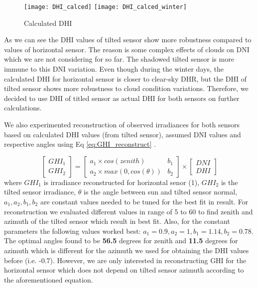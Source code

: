 \begin{figure}[h]
\caption{Calculated DHI}
\label{fig:calc_DHI_day}
\texttt{[image: DHI\_calced]}
\texttt{[image: DHI\_calced\_winter]}
\centering
\end{figure}

As we can see the DHI values of tilted sensor show more robustness compared to values of horizontal sensor. The reason is some complex effects of clouds on DNI which we are not considering for so far. The shadowed tilted sensor is more immune to this DNI variation.  Even though during the winter days, the calculated DHI for horizontal sensor is closer to clear-sky DHR, but the DHI of tilted sensor shows more robustness to cloud condition variations. Therefore, we decided to use DHI of titled sensor as actual DHI for both sensors on further calculations.

We also experimented reconstruction of observed irradiances for both sensors based on calculated DHI values (from tilted sensor), assumed DNI values and respective angles using Eq \ref{eq:GHI_reconstruct} . 

\begin{equation}
\label{eq:GHI_reconstruct}
\left[ \begin{array}{c} GHI_1 \\ GHI_2 \end{array} \right] = \begin{bmatrix} a_1 \times cos(zenith) & b_1 \\ a_2 \times max(0, cos(\theta)) & b_2 \end{bmatrix} \times \left[ \begin{array}{c} DNI \\ DHI \end{array} \right]
\end{equation}
where $GHI_1$ is irradiance reconstructed for horizontal senor (1), $GHI_2$ is the tilted sensor irradiance, $\theta$ is the angle between sun and tilted sensor normal, $a_1, a_2, b_1, b_2$ are constant values needed to be tuned for the best fit in result. For reconstruction we evaluated different values in range of 5 to 60 to find zenith and azimuth of the tilted sensor which result in best fit. Also, for the constant parameters the following values worked best: $a_1=0.9, a_2=1, b_1=1.14, b_2=0.78$. The optimal angles found to be \textbf{56.5} degrees for zenith and \textbf{11.5} degrees for azimuth which is different for the azimuth we used for obtaining the DHI values before (i.e. -0.7). However, we are only interested in reconstructing GHI for the horizontal sensor which does not depend on tilted sensor azimuth according to the aforementioned equation.

